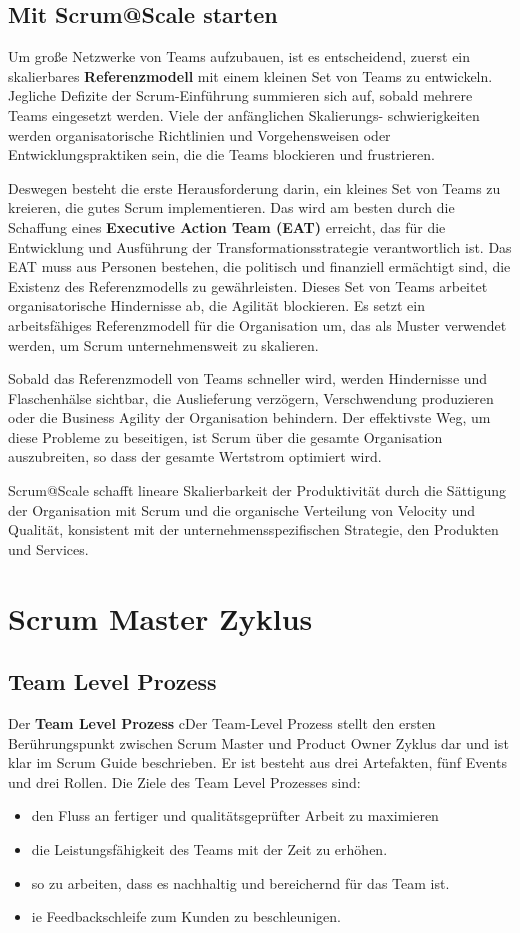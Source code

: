 \documentclass[12pt,a4paper,parskip=full]{scrartcl}
\begin{document}
\subsection{Mit Scrum@Scale starten}
Um große Netzwerke von Teams aufzubauen, ist es entscheidend, zuerst ein
skalierbares \textbf{Referenzmodell} mit einem kleinen Set von Teams zu
entwickeln. Jegliche Defizite der Scrum-Einführung summieren sich auf, sobald
mehrere Teams eingesetzt werden. Viele der anfänglichen Skalierungs-
schwierigkeiten werden organisatorische Richtlinien und Vorgehensweisen oder
Entwicklungspraktiken sein, die die Teams blockieren und frustrieren.

Deswegen besteht die erste Herausforderung darin, ein kleines Set von Teams
zu kreieren, die gutes Scrum implementieren. Das wird am besten durch die
Schaffung eines \textbf{Executive Action Team (EAT)} erreicht, das für die
Entwicklung und Ausführung der Transformationsstrategie verantwortlich ist.
Das EAT muss aus Personen bestehen, die politisch und finanziell ermächtigt
sind, die Existenz des Referenzmodells zu gewährleisten. Dieses Set von Teams
arbeitet organisatorische Hindernisse ab, die Agilität blockieren. Es setzt
ein arbeitsfähiges Referenzmodell für die Organisation um, das als Muster
 verwendet werden, um Scrum unternehmensweit zu skalieren.

Sobald das Referenzmodell von Teams schneller wird, werden Hindernisse und
Flaschenhälse sichtbar, die Auslieferung verzögern, Verschwendung produzieren
oder die Business Agility der Organisation behindern. Der effektivste Weg, um
diese Probleme zu beseitigen, ist Scrum über die gesamte Organisation
auszubreiten, so dass der gesamte Wertstrom optimiert wird.

Scrum@Scale schafft lineare Skalierbarkeit der Produktivität durch die
Sättigung der Organisation mit Scrum und die organische Verteilung von Velocity
und Qualität, konsistent mit der unternehmensspezifischen Strategie, den
Produkten und Services.

\section{Scrum Master Zyklus}
\subsection{Team Level Prozess}
Der \textbf{Team Level Prozess} cDer Team-Level Prozess stellt den ersten Berührungspunkt
zwischen Scrum Master und Product Owner Zyklus dar und ist klar im Scrum Guide beschrieben.
Er ist besteht aus drei Artefakten, fünf Events und drei Rollen.
Die Ziele des Team Level Prozesses sind:
\begin{itemize}
\item den Fluss an fertiger und qualitätsgeprüfter Arbeit zu maximieren
\item die Leistungsfähigkeit des Teams mit der Zeit zu erhöhen.
\item so zu arbeiten, dass es nachhaltig und bereichernd für das Team ist.
\item ie Feedbackschleife zum Kunden zu beschleunigen.
\end{itemize}
\end{document}

